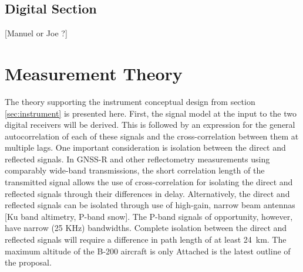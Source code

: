 \documentclass[draftcls,onecolumn]{IEEEtran}  %
\begin{document}
\subsection{Digital Section}
\label{sec:digital}

[Manuel or Joe ?]

\section{Measurement Theory}
 \label{section:Algorithm}

%
%
 The theory supporting the instrument conceptual design from section \ref{sec:instrument} is presented here. 
 First, the signal model at the input to the two digital receivers will be derived.
 This is followed by an expression for the general autocorrelation of each of these signals and the cross-correlation between them at multiple lags.  
 One important consideration is isolation between the direct and reflected signals.  
 In GNSS-R and other reflectometry measurements using comparably wide-band transmissions, the short correlation length of the transmitted signal allows the use of cross-correlation for isolating the direct and reflected signals through their differences in delay. 
 Alternatively, the direct and reflected signals can be isolated through use of high-gain, narrow beam antennas [Ku band altimetry, P-band snow]. 
 The P-band signals of opportunity, however, have narrow (25 KHz) bandwidths. 
 Complete isolation between the direct and reflected signals will require a difference in path length of at least 24~km. 
 The maximum altitude of the B-200 aircraft is only Attached is the latest outline of the proposal.

 
 
\end{document}
